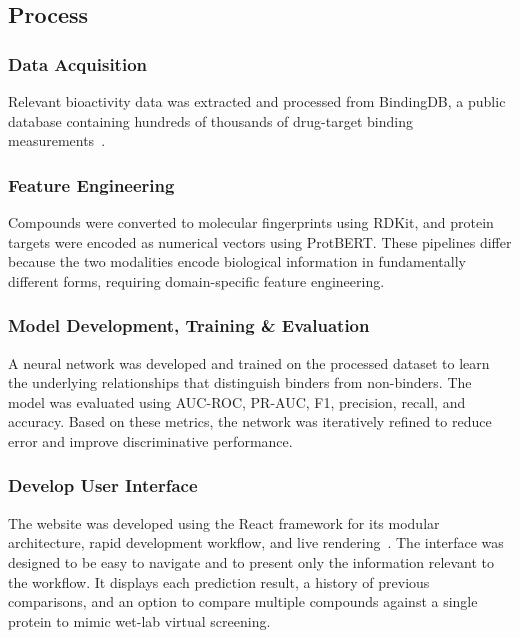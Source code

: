 \subsection{Process}
\subsubsection{Data Acquisition}
Relevant bioactivity data was extracted and processed from BindingDB, a public database containing hundreds of thousands of drug-target binding measurements~\citep{Liu2025}.
\subsubsection{Feature Engineering}
Compounds were converted to molecular fingerprints using RDKit, and protein targets were encoded as numerical vectors using ProtBERT.
These pipelines differ because the two modalities encode biological information in fundamentally different forms, requiring domain-specific feature engineering.
\subsubsection{Model Development, Training \& Evaluation}
A neural network was developed and trained on the processed dataset to learn the underlying relationships that distinguish binders from non-binders.
The model was evaluated using AUC-ROC, PR-AUC, F1, precision, recall, and accuracy.
Based on these metrics, the network was iteratively refined to reduce error and improve discriminative performance.
\subsubsection{Develop User Interface}
The website was developed using the React framework for its modular architecture, rapid development workflow, and live rendering~\citep{aggarwal2018react}.
The interface was designed to be easy to navigate and to present only the information relevant to the workflow.
It displays each prediction result, a history of previous comparisons, and an option to compare multiple compounds against a single protein to mimic wet-lab virtual screening.
